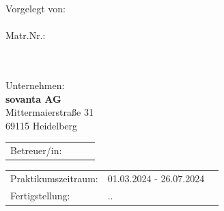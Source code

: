 \begin{center}

\vspace{1cm}

\begin{minipage}[t][5cm][s]{\textwidth}%
\centering
\Huge{{\color{green}{\fontsize{24}{30} \selectfont \workTitle\\}}}
\vspace{0.5cm}
\LARGE{{\color{green}{\fontsize{16}{24} \selectfont \subTitle\\}}}
\end{minipage}

Vorgelegt von:\\ 
\fontsize{15pt}{15pt}\selectfont
\textbf{\studentFirstName\ \studentLastName} \\
\fontsize{11pt}{15pt}\selectfont
Matr.Nr.: \studentId \\
\courseOfStudy
  
\vspace{1.3cm}
    	\fontsize{11pt}{15pt}\selectfont \universityName\\ 
	\faculty \\

\vspace{1.3cm}
    	\fontsize{11pt}{15pt}\selectfont Unternehmen: \\
		\textbf{sovanta AG}\\ 
		Mittermaierstraße 31 \\
		69115 Heidelberg

\vspace{1cm}

\begin{tabular}{lll}
	Betreuer/in: & \advisorPreTitle\ \advisoFirstName\ \advisorLastName \advisorPosTitle\\
\end{tabular}

\vspace{1cm}

\begin{tabular}{lll}
	\fontsize{11pt}{15pt}\selectfont Praktikumszeitraum: & 01.03.2024 - 26.07.2024\\
	Fertigstellung: & \dateDay.\dateMonth.\dateYear
\end{tabular}


\end{center}

\restoregeometry